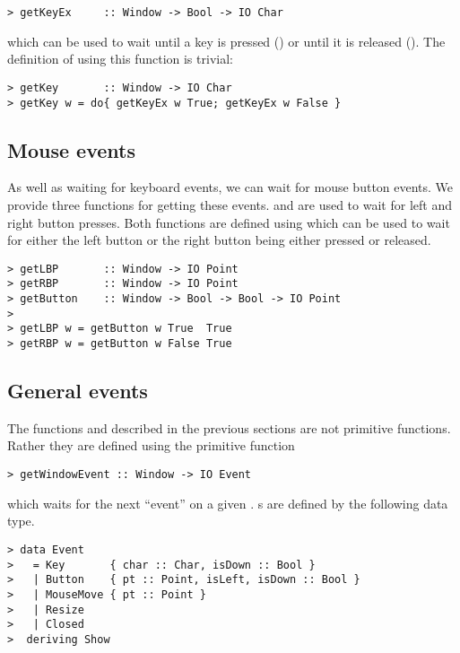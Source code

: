 \begin{verbatim}
> getKeyEx     :: Window -> Bool -> IO Char
\end{verbatim}

which can be used to wait until a key is pressed ()
or until it is released ().  The definition of
 using this function is trivial:

\begin{verbatim}
> getKey       :: Window -> IO Char
> getKey w = do{ getKeyEx w True; getKeyEx w False }
\end{verbatim}


\subsection{Mouse events}

As well as waiting for keyboard events, we can wait for mouse button
events.  We provide three functions for getting these events.
 and  are used to wait for left and right
button presses.  Both functions are defined using 
which can be used to wait for either the left button or the right
button being either pressed or released.

\begin{verbatim}
> getLBP       :: Window -> IO Point
> getRBP       :: Window -> IO Point
> getButton    :: Window -> Bool -> Bool -> IO Point
>
> getLBP w = getButton w True  True
> getRBP w = getButton w False True
\end{verbatim}


\subsection{General events}

The functions  and  described in the
previous sections are not primitive functions.  Rather they are
defined using the primitive function 

\begin{verbatim}
> getWindowEvent :: Window -> IO Event
\end{verbatim}

which waits for the next ``event'' on a given .
s are defined by the following data type.

\begin{verbatim}
> data Event 
>   = Key       { char :: Char, isDown :: Bool }
>   | Button    { pt :: Point, isLeft, isDown :: Bool }
>   | MouseMove { pt :: Point }
>   | Resize
>   | Closed
>  deriving Show 
\end{verbatim}

